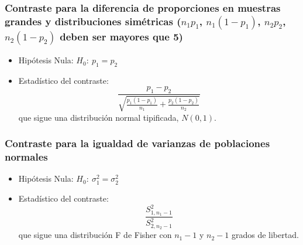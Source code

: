 \subsubsection{Contraste para la diferencia de proporciones en muestras grandes y distribuciones simétricas ($n_1p_1$, $n_1(1-p_1)$, $n_2p_2$,
$n_2(1-p_2)$ deben ser mayores que 5)}
\begin{itemize}
\item Hipótesis Nula: $H_0:\ p_1=p_2$
\item Estadístico del contraste:
\[
\frac{{p_1  - p_2 }}{{\sqrt {\frac{{p_1 \left( {1 - p_1 }\right)}}{{n_1 }} + \frac{{p_2 \left( {1 - p_2 } \right)}}{{n_2}}} }}
\]
que sigue una distribución normal tipificada, $N(0,1)$.
\end{itemize}

\subsubsection{Contraste para la igualdad de varianzas de poblaciones normales}
\begin{itemize}
\item Hipótesis Nula: $H_0:\ \sigma_1^2=\sigma_2^2$
\item Estadístico del contraste:
\[
\frac{{S^2 _{1,n_1  - 1} }}{{S^2 _{2,n_2  - 1} }}
\]
que sigue una distribución F de Fisher con $n_1-1$ y $n_2-1$ grados de libertad.
\end{itemize}

\clearpage
\newpage

